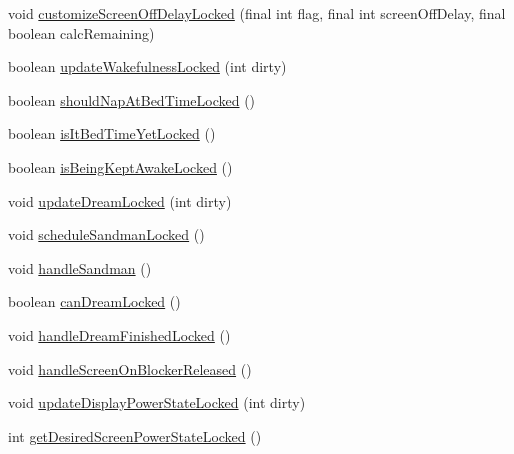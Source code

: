 \begin{DoxyCompactItemize}
void \hyperlink{classcom_1_1android_1_1server_1_1power_1_1PowerManagerService_a0d47dd85f1c38654631c77bcb187e550}{customize\-Screen\-Off\-Delay\-Locked} (final int flag, final int screen\-Off\-Delay, final boolean calc\-Remaining)
\item 
boolean \hyperlink{classcom_1_1android_1_1server_1_1power_1_1PowerManagerService_a602d34352a098033e9d32ba80b963171}{update\-Wakefulness\-Locked} (int dirty)
\item 
boolean \hyperlink{classcom_1_1android_1_1server_1_1power_1_1PowerManagerService_a39ea6ad032c7a47ab15b3c9f776e04bf}{should\-Nap\-At\-Bed\-Time\-Locked} ()
\item 
boolean \hyperlink{classcom_1_1android_1_1server_1_1power_1_1PowerManagerService_a8643470d860e5f6411a0dc710aa7e86d}{is\-It\-Bed\-Time\-Yet\-Locked} ()
\item 
boolean \hyperlink{classcom_1_1android_1_1server_1_1power_1_1PowerManagerService_a279565ba81245941643a0136a518dbef}{is\-Being\-Kept\-Awake\-Locked} ()
\item 
void \hyperlink{classcom_1_1android_1_1server_1_1power_1_1PowerManagerService_abd5540fc6acfe501a7c91fb9cd6f6169}{update\-Dream\-Locked} (int dirty)
\item 
void \hyperlink{classcom_1_1android_1_1server_1_1power_1_1PowerManagerService_a8ee4f96f8939910ef1c42939ad19ce77}{schedule\-Sandman\-Locked} ()
\item 
void \hyperlink{classcom_1_1android_1_1server_1_1power_1_1PowerManagerService_ab179453009d07b0567e470f3ee454ad0}{handle\-Sandman} ()
\item 
boolean \hyperlink{classcom_1_1android_1_1server_1_1power_1_1PowerManagerService_ae9ad75267601483cdd11f47940a15af1}{can\-Dream\-Locked} ()
\item 
void \hyperlink{classcom_1_1android_1_1server_1_1power_1_1PowerManagerService_afece0f0a3a763044fde8695102c1990b}{handle\-Dream\-Finished\-Locked} ()
\item 
void \hyperlink{classcom_1_1android_1_1server_1_1power_1_1PowerManagerService_a7482ef488a930d68eb9cf3df7aa18c85}{handle\-Screen\-On\-Blocker\-Released} ()
\item 
void \hyperlink{classcom_1_1android_1_1server_1_1power_1_1PowerManagerService_aae3945c0365aca81e86da7ab61fb8a8c}{update\-Display\-Power\-State\-Locked} (int dirty)
\item 
int \hyperlink{classcom_1_1android_1_1server_1_1power_1_1PowerManagerService_ad205b7f8dc4db8fc5c724cd257e6288b}{get\-Desired\-Screen\-Power\-State\-Locked} ()
\item 

\end{DoxyCompactItemize}
